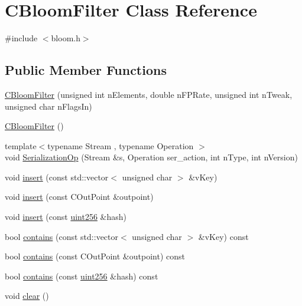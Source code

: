 \hypertarget{class_c_bloom_filter}{}\section{C\+Bloom\+Filter Class Reference}
\label{class_c_bloom_filter}


{\ttfamily \#include $<$bloom.\+h$>$}

\subsection*{Public Member Functions}
\begin{DoxyCompactItemize}
\item 
\hyperlink{class_c_bloom_filter_a6395cfcb278ed9cf4ae873549c996f83}{C\+Bloom\+Filter} (unsigned int n\+Elements, double n\+F\+P\+Rate, unsigned int n\+Tweak, unsigned char n\+Flags\+In)
\item 
\hyperlink{class_c_bloom_filter_ab38a984b1020bc4afd85c06e90353b28}{C\+Bloom\+Filter} ()
\item 
{\footnotesize template$<$typename Stream , typename Operation $>$ }\\void \hyperlink{class_c_bloom_filter_a2d12234d7febc6197a7349d609733cca}{Serialization\+Op} (Stream \&s, Operation ser\+\_\+action, int n\+Type, int n\+Version)
\item 
void \hyperlink{class_c_bloom_filter_abba52843c7c691ef7deb07d9a645dcc2}{insert} (const std\+::vector$<$ unsigned char $>$ \&v\+Key)
\item 
void \hyperlink{class_c_bloom_filter_aa77e023fc94fd17a0532bf17906e2146}{insert} (const C\+Out\+Point \&outpoint)
\item 
void \hyperlink{class_c_bloom_filter_ac86479ac4ac157a7f0188baaa93202cb}{insert} (const \hyperlink{classuint256}{uint256} \&hash)
\item 
bool \hyperlink{class_c_bloom_filter_ac86c47e17a6e3d1cae4f581accc70e72}{contains} (const std\+::vector$<$ unsigned char $>$ \&v\+Key) const 
\item 
bool \hyperlink{class_c_bloom_filter_a962136f96fb6b237613259b18b34ba6d}{contains} (const C\+Out\+Point \&outpoint) const 
\item 
bool \hyperlink{class_c_bloom_filter_a7b4d06836a811a7282fb60f0697b2e1c}{contains} (const \hyperlink{classuint256}{uint256} \&hash) const 
\item 
void \hyperlink{class_c_bloom_filter_abf30228c0b24c57530f6b6734cd40252}{clear} ()
\item 

\end{DoxyCompactItemize}
